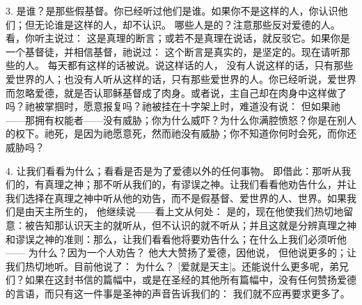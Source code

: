 3.   是谁？是那些假基督。你已经听过他们是谁。如果你不是这样的人，你认识他们；但无论谁是这样的人，却不认识。 哪些人是的？注意那些反对爱德的人。看，你听主说过：  这是真理的断言；或若不是真理在说话，就反驳它。如果你是一个基督徒，并相信基督，祂说过： 这个断言是真实的，是坚定的。现在请听那些的人。 每天都有这样的话被说。说这样话的人， 没有人说这样的话，只有那些爱世界的人；也没有人听从这样的话，只有那些爱世界的人。你已经听说，爱世界而忽略爱德，就是否认耶稣基督成了肉身。或者说，主自己却在肉身中这样做了吗？祂被掌掴时，愿意报复吗？祂被挂在十字架上时，难道没有说：  但如果祂——那拥有权能者——没有威胁；你为什么威吓？为什么你满腔愤怒？你是在别人的权下。祂死，是因为祂愿意死，然而祂没有威胁；你不知道你何时会死，而你还威胁吗？\par

4.   让我们看看为什么；看看是否是为了爱德以外的任何事物。 即借此：那听从我们的，有真理之神；那不听从我们的，有谬误之神。让我们看看他劝告什么，并让我们选择在真理之神中听从他的劝告，而不是假基督、爱世界的人、世界。如果我们是由天主所生的，  他继续说——看上文从何处： 是的，现在他使我们热切地留意：被告知那认识天主的就听从，但不认识的就不听从；并且这就是分辨真理之神和谬误之神的准则：那么，让我们看看他将要劝告什么；在什么上我们必须听他——  为什么？因为一个人劝告？ 他大大赞扬了爱德，因他说， 但他说更多的；让我们热切地听。目前他说了：  为什么？ [爱就是天主]。还能说什么更多呢，弟兄们？如果在这封书信的篇幅中，或是在圣经的其他所有篇幅中，没有任何赞扬爱德的言语，而只有这一件事是圣神的声音告诉我们的： 我们就不应再要求更多了。\par

